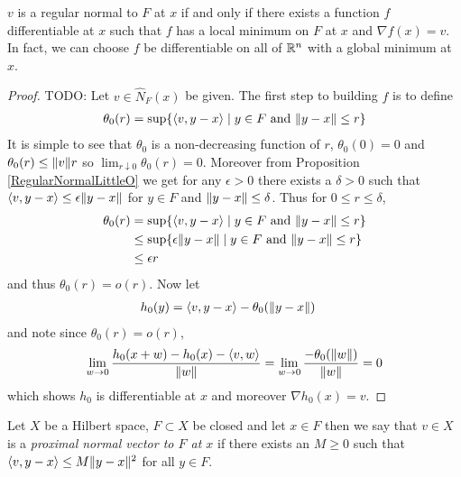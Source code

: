 \begin{thm}$v$ is a regular normal to $F$ at $x$ if and only if there exists a function $f$ differentiable at $x$ such that 
$f$ has a local minimum on $F$ at $x$ and $\nabla f (x) = v$.  In fact, we can choose $f$ be differentiable on all of $\mathbb{R}^n$ 
with a global minimum at $x$.
\end{thm}
\begin{proof}
TODO:  
Let $v \in \widehat{N}_F(x)$ be given.  The first step to building $f$ is to define
\begin{align*}
\theta_0(r) = \sup \lbrace \langle v, y - x \rangle \mid y \in F \text{ and } \lVert y-x \rVert \leq r \rbrace
\end{align*}
It is simple to see that $\theta_0$ is a non-decreasing function of $r$,  $\theta_0(0) = 0$ and
$\theta_0(r) \leq \lVert v \rVert r$ so $\lim_{r \downarrow 0} \theta_0(r) = 0$. 
Moreover from Proposition \ref{RegularNormalLittleO} we get for any $\epsilon > 0$ there exists a $\delta > 0$ such that
$\langle v, y-x \rangle \leq \epsilon \lVert y-x \rVert$ for $y \in F$ and $\lVert y-x \rVert \leq \delta$.    Thus for $0 \leq r \leq \delta$, 
\begin{align*}
\theta_0(r)&= \sup \lbrace \langle v, y - x \rangle \mid y \in F \text{ and } \lVert y-x \rVert \leq r \rbrace \\
&\leq \sup \lbrace \epsilon \lVert y-x \rVert \mid y \in F \text{ and } \lVert y-x \rVert \leq r \rbrace \\
&\leq \epsilon r \\
\end{align*}
and thus $\theta_0(r) = o(r)$.
Now let 
\begin{align*}
h_0(y) &= \langle v, y-x\rangle - \theta_0(\lVert y-x \rVert)
\end{align*}
and note since $\theta_0(r) = o(r)$,
\begin{align*}
\lim_{w \to 0} \frac{h_0(x+w) - h_0(x) - \langle v,w \rangle}{\lVert w \rVert} =\lim_{w \to 0} \frac{-\theta_0(\lVert w \rVert)}{\lVert w \rVert} =0\\
\end{align*}
which shows $h_0$ is differentiable at $x$ and moreover $\nabla h_0(x) = v$.
\end{proof}

\begin{defn}Let $X$ be a Hilbert space, $F \subset X$ be closed and let
  $x \in F$ then we say that $v \in X$ is a \emph{proximal normal
    vector to $F$ at $x$} if there exists an $M \geq 0$ such that
  $\langle v, y - x \rangle \leq M \lVert y - x \rVert^2$ for all $y \in F$.
\end{defn}

